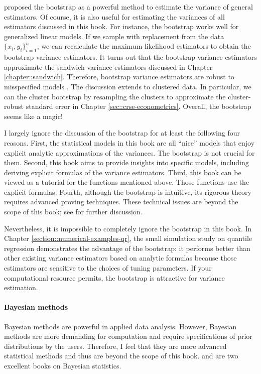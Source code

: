 \citet{efron1979bootstrap} proposed the bootstrap as a powerful method to estimate the variance of general estimators. Of course, it is also useful for estimating the variances of all estimators discussed in this book. For instance, the bootstrap works well for generalized linear models. If we sample with replacement from the data $\{ x_i, y_i \}_{i=1}^n$, we can recalculate the maximum likelihood estimators to obtain the bootstrap variance estimators. It turns out that the bootstrap variance estimators approximate the sandwich variance estimators discussed in Chapter \ref{chapter::sandwich}. Therefore, bootstrap variance estimators are robust to misspecified models \citep{buja2019models, buja2019models2}. The discussion extends to clustered data. In particular, we can  the cluster bootstrap by resampling the clusters to approximate the cluster-robust standard error in Chapter \ref{sec::crse-econometrics}. Overall, the bootstrap seems like a magic!






I largely ignore the discussion of the bootstrap for at least the following four reasons. First, the statistical models in this book are all ``nice'' models that enjoy explicit analytic approximations of the variances. The bootstrap is not crucial for them. Second, this book aims to provide insights into specific models, including deriving explicit formulas of the variance estimators. Third, this book can be viewed as a tutorial for the  functions mentioned above. Those  functions use the explicit formulas. Fourth, although the bootstrap is intuitive, its rigorous theory requires advanced proving techniques. These technical issues are beyond the scope of this book; see \citet{wu1986jackknife, mammen1992does, shao1995jackknife} for further discussion.  


Nevertheless, it is impossible to completely ignore the bootstrap in this book. In Chapter \ref{section::numerical-examples-qr}, the small simulation study on quantile regression demonstrates the advantage of the bootstrap: it performs better than other existing variance estimators based on analytic formulas because those estimators are sensitive to the choices of tuning parameters. If your computational resource permits, the bootstrap is attractive for variance estimation. 




\paragraph*{Bayesian methods}
Bayesian methods are powerful in applied data analysis. 
However, Bayesian methods are more demanding for computation and require specifications of prior distributions by the users. Therefore, I feel that they are more advanced statistical methods and thus are beyond the scope of this book. \citet{hoff2009first} and \citet{gelman2013bayesian} are two excellent books on Bayesian statistics. 





